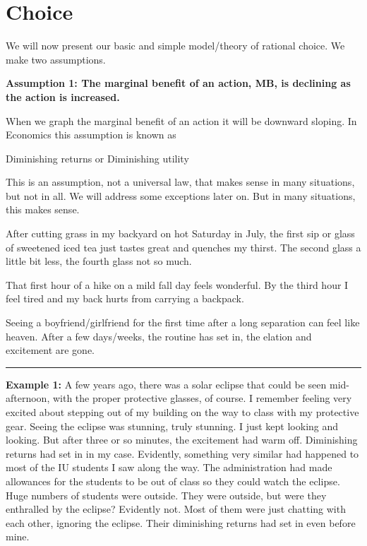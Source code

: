 \documentclass[
]{book}
\begin{document}
\hypertarget{choice}{%
\section{Choice}\label{choice}}

We will now present our basic and simple model/theory of rational choice. We make two assumptions.

\begin{center}
\textbf{Assumption 1: The marginal benefit of an action, MB, is declining as the action is increased.}

\end{center}

When we graph the marginal benefit of an action it will be downward sloping. In Economics this assumption is known as

\begin{center}
Diminishing returns
or
Diminishing utility

\end{center}

This is an assumption, not a universal law, that makes sense in many situations, but not in all. We will address some exceptions later on. But in many situations, this makes sense.

After cutting grass in my backyard on hot Saturday in July, the first sip or glass of sweetened iced tea just tastes great and quenches my thirst. The second glass a little bit less, the fourth glass not so much.

That first hour of a hike on a mild fall day feels wonderful. By the third hour I feel tired and my back hurts from carrying a backpack.

Seeing a boyfriend/girlfriend for the first time after a long separation can feel like heaven. After a few days/weeks, the routine has set in, the elation and excitement are gone.

\begin{center}\rule{0.5\linewidth}{0.5pt}\end{center}

\textbf{Example 1:} A few years ago, there was a solar eclipse that could be seen mid-afternoon, with the proper protective glasses, of course. I remember feeling very excited about stepping out of my building on the way to class with my protective gear. Seeing the eclipse was stunning, truly stunning. I just kept looking and looking. But after three or so minutes, the excitement had warm off. Diminishing returns had set in in my case. Evidently, something very similar had happened to most of the IU students I saw along the way. The administration had made allowances for the students to be out of class so they could watch the eclipse. Huge numbers of students were outside. They were outside, but were they enthralled by the eclipse? Evidently not. Most of them were just chatting with each other, ignoring the eclipse. Their diminishing returns had set in even before mine.
\end{document}
